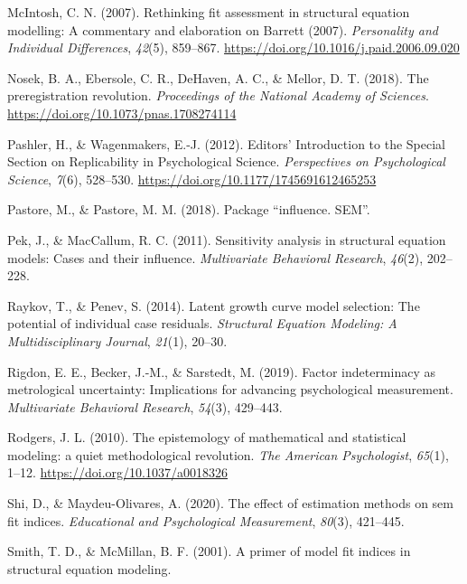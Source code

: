 \documentclass[
  english,
  doc]{apa6}
\newlength{\cslhangindent}
\newenvironment{cslreferences}%
  {\setlength{\parindent}{0pt}%
  \everypar{\setlength{\hangindent}{\cslhangindent}}\ignorespaces}%
  {\par}
\begin{document}
\begin{cslreferences}
\leavevmode\hypertarget{ref-McIntosh2007}{}%
McIntosh, C. N. (2007). Rethinking fit assessment in structural equation modelling: A commentary and elaboration on Barrett (2007). \emph{Personality and Individual Differences}, \emph{42}(5), 859--867. \url{https://doi.org/10.1016/j.paid.2006.09.020}

\leavevmode\hypertarget{ref-Nosek2018}{}%
Nosek, B. A., Ebersole, C. R., DeHaven, A. C., \& Mellor, D. T. (2018). The preregistration revolution. \emph{Proceedings of the National Academy of Sciences}. \url{https://doi.org/10.1073/pnas.1708274114}

\leavevmode\hypertarget{ref-Pashler2012a}{}%
Pashler, H., \& Wagenmakers, E.-J. (2012). Editors' Introduction to the Special Section on Replicability in Psychological Science. \emph{Perspectives on Psychological Science}, \emph{7}(6), 528--530. \url{https://doi.org/10.1177/1745691612465253}

\leavevmode\hypertarget{ref-pastore2018package}{}%
Pastore, M., \& Pastore, M. M. (2018). Package ``influence. SEM''.

\leavevmode\hypertarget{ref-pek2011sensitivity}{}%
Pek, J., \& MacCallum, R. C. (2011). Sensitivity analysis in structural equation models: Cases and their influence. \emph{Multivariate Behavioral Research}, \emph{46}(2), 202--228.

\leavevmode\hypertarget{ref-raykov2014latent}{}%
Raykov, T., \& Penev, S. (2014). Latent growth curve model selection: The potential of individual case residuals. \emph{Structural Equation Modeling: A Multidisciplinary Journal}, \emph{21}(1), 20--30.

\leavevmode\hypertarget{ref-rigdon2019factor}{}%
Rigdon, E. E., Becker, J.-M., \& Sarstedt, M. (2019). Factor indeterminacy as metrological uncertainty: Implications for advancing psychological measurement. \emph{Multivariate Behavioral Research}, \emph{54}(3), 429--443.

\leavevmode\hypertarget{ref-rodgers_epistemology_2010}{}%
Rodgers, J. L. (2010). The epistemology of mathematical and statistical modeling: a quiet methodological revolution. \emph{The American Psychologist}, \emph{65}(1), 1--12. \url{https://doi.org/10.1037/a0018326}

\leavevmode\hypertarget{ref-shi2020effect}{}%
Shi, D., \& Maydeu-Olivares, A. (2020). The effect of estimation methods on sem fit indices. \emph{Educational and Psychological Measurement}, \emph{80}(3), 421--445.

\leavevmode\hypertarget{ref-smith2001primer}{}%
Smith, T. D., \& McMillan, B. F. (2001). A primer of model fit indices in structural equation modeling.


\end{cslreferences}
\end{document}
